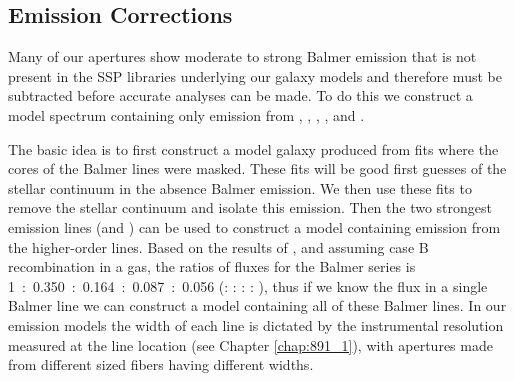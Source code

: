 

\subsection{Emission Corrections}
\label{891_2:sec:emission_corr}

Many of our apertures show moderate to strong Balmer emission that is
not present in the SSP libraries underlying our galaxy models and
therefore must be subtracted before accurate analyses can be made. To
do this we construct a model spectrum containing only emission from
\Ha, \HB, \Hg, \Hd, and \He. 

The basic idea is to first construct a model galaxy produced from fits
where the cores of the Balmer lines were masked. These fits will be
good first guesses of the stellar continuum in the absence Balmer
emission. We then use these fits to remove the stellar continuum and
isolate this emission. Then the two strongest emission lines (\Ha and
\HB) can be used to construct a model containing emission from the
higher-order lines.  Based on the results of \citet{Osterbrock89}, and
assuming case B recombination in a  gas, the ratios of
fluxes for the Balmer series is \mbox{1 : 0.350 : 0.164 : 0.087 :
  0.056} (\Ha : \HB : \Hg : \Hd : \He), thus if we know the flux in a
single Balmer line we can construct a model containing all of these
Balmer lines. In our emission models the width of each line is
dictated by the instrumental resolution measured at the line location
(see Chapter \ref{chap:891_1}), with apertures made from different
sized \GP fibers having different widths.

